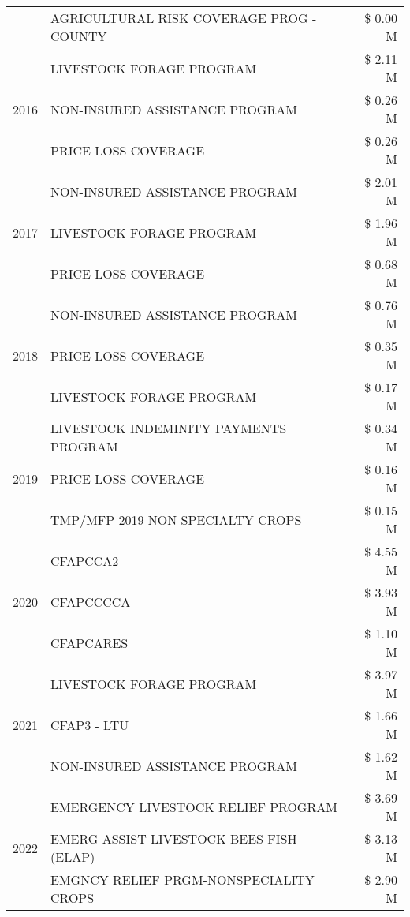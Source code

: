 \begin{tabular}{llr}
 & AGRICULTURAL RISK COVERAGE PROG - COUNTY & \$ 0.00 M \\
\cline{1-3}
\multirow[t]{3}{*}{2016} & LIVESTOCK FORAGE PROGRAM & \$ 2.11 M \\
 & NON-INSURED ASSISTANCE PROGRAM & \$ 0.26 M \\
 & PRICE LOSS COVERAGE & \$ 0.26 M \\
\cline{1-3}
\multirow[t]{3}{*}{2017} & NON-INSURED ASSISTANCE PROGRAM & \$ 2.01 M \\
 & LIVESTOCK FORAGE PROGRAM & \$ 1.96 M \\
 & PRICE LOSS COVERAGE & \$ 0.68 M \\
\cline{1-3}
\multirow[t]{3}{*}{2018} & NON-INSURED ASSISTANCE PROGRAM & \$ 0.76 M \\
 & PRICE LOSS COVERAGE & \$ 0.35 M \\
 & LIVESTOCK FORAGE PROGRAM & \$ 0.17 M \\
\cline{1-3}
\multirow[t]{3}{*}{2019} & LIVESTOCK INDEMINITY PAYMENTS PROGRAM & \$ 0.34 M \\
 & PRICE LOSS COVERAGE & \$ 0.16 M \\
 & TMP/MFP 2019 NON SPECIALTY CROPS & \$ 0.15 M \\
\cline{1-3}
\multirow[t]{3}{*}{2020} & CFAPCCA2 & \$ 4.55 M \\
 & CFAPCCCCA & \$ 3.93 M \\
 & CFAPCARES & \$ 1.10 M \\
\cline{1-3}
\multirow[t]{3}{*}{2021} & LIVESTOCK FORAGE PROGRAM & \$ 3.97 M \\
 & CFAP3 - LTU & \$ 1.66 M \\
 & NON-INSURED ASSISTANCE PROGRAM & \$ 1.62 M \\
\cline{1-3}
\multirow[t]{3}{*}{2022} & EMERGENCY LIVESTOCK RELIEF PROGRAM & \$ 3.69 M \\
 & EMERG ASSIST LIVESTOCK BEES FISH (ELAP) & \$ 3.13 M \\
 & EMGNCY RELIEF PRGM-NONSPECIALITY CROPS & \$ 2.90 M \\
\cline{1-3}
\bottomrule
\end{tabular}
